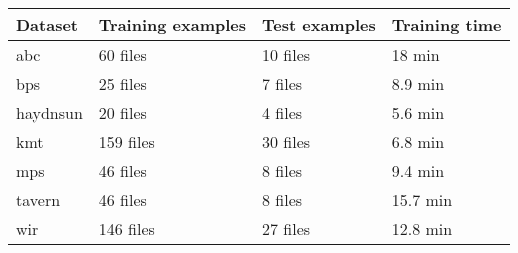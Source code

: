 \begin{tabular}{l|lll}
Dataset        & Training examples & Test examples & Training time \\ \hline
\gls{abc}      & 60  files            & 10 files        & 18 min        \\
\gls{bps}      & 25  files            & 7  files        & 8.9 min       \\
\gls{haydnsun} & 20  files            & 4  files        & 5.6 min       \\
\gls{kmt}      & 159 files            & 30 files        & 6.8 min       \\
\gls{mps}      & 46  files            & 8  files        & 9.4 min       \\
\gls{tavern}   & 46  files            & 8  files        & 15.7 min      \\
\gls{wir}      & 146 files            & 27 files        & 12.8 min     
\end{tabular}
